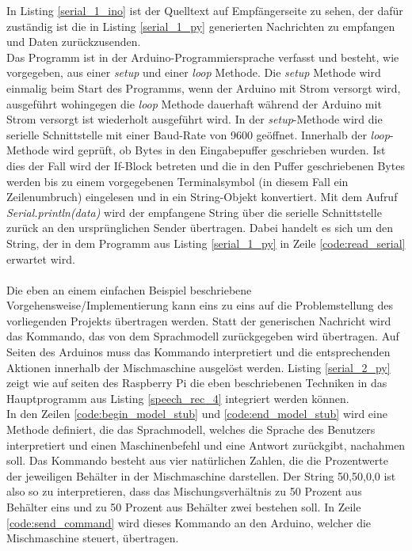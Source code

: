 In Listing \ref{serial_1_ino} ist der Quelltext auf Empfängerseite zu sehen, der dafür zuständig ist die in Listing \ref{serial_1_py} generierten Nachrichten zu empfangen und Daten zurückzusenden.\\

Das Programm ist in der Arduino-Programmiersprache verfasst und besteht, wie vorgegeben, aus einer \textit{setup} und einer \textit{loop} Methode. Die \textit{setup} Methode wird einmalig beim Start des Programms, wenn der Arduino mit Strom versorgt wird, ausgeführt wohingegen die \textit{loop} Methode dauerhaft während der Arduino mit Strom versorgt ist wiederholt ausgeführt wird. In der \textit{setup}-Methode wird die serielle Schnittstelle mit einer Baud-Rate von 9600 geöffnet. Innerhalb der \textit{loop}-Methode wird geprüft, ob Bytes in den Eingabepuffer geschrieben wurden. Ist dies der Fall wird der If-Block betreten und die in den Puffer geschriebenen Bytes werden bis zu einem vorgegebenen Terminalsymbol (in diesem Fall ein Zeilenumbruch) eingelesen und in ein String-Objekt konvertiert. Mit dem Aufruf \textit{Serial.println(data)} wird der empfangene String über die serielle Schnittstelle zurück an den ursprünglichen Sender übertragen. Dabei handelt es sich um den String, der in dem Programm aus Listing \ref{serial_1_py} in Zeile \ref{code:read_serial} erwartet wird.\\\\
Die eben an einem einfachen Beispiel beschriebene Vorgehensweise/Implementierung kann eins zu eins auf die Problemstellung des vorliegenden Projekts übertragen werden. Statt der generischen Nachricht wird das Kommando, das von dem Sprachmodell zurückgegeben wird übertragen. Auf Seiten des Arduinos muss das Kommando interpretiert und die entsprechenden Aktionen innerhalb der Mischmaschine ausgelöst werden. Listing \ref{serial_2_py} zeigt wie auf seiten des Raspberry Pi die eben beschriebenen Techniken in das Hauptprogramm aus Listing \ref{speech_rec_4} integriert werden können.\\

In den Zeilen \ref{code:begin_model_stub} und \ref{code:end_model_stub} wird eine Methode definiert, die das Sprachmodell, welches die Sprache des Benutzers interpretiert und einen Maschinenbefehl und eine Antwort zurückgibt, nachahmen soll. Das Kommando besteht aus vier natürlichen Zahlen, die die Prozentwerte der jeweiligen Behälter in der Mischmaschine darstellen. Der String \glqq{}50,50,0,0\grqq{} ist also so zu interpretieren, dass das Mischungsverhältnis zu 50 Prozent aus Behälter eins und zu 50 Prozent aus Behälter zwei bestehen soll. In Zeile \ref{code:send_command} wird dieses Kommando an den Arduino, welcher die Mischmaschine steuert, übertragen.\\\\
